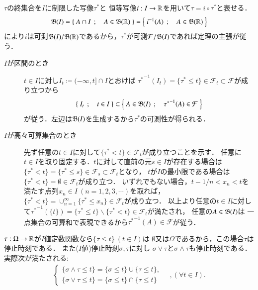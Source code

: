 	\begin{prf}
		$\tau$の終集合を$I$に制限した写像$\tau^*$と
		恒等写像$i:I \rightarrow \mathbb{R}$を用いて$\tau = i \circ \tau^*$と表せる．
		\begin{align}
			\mathfrak{B}(I)=\left\{\ A \cap I\ \, ; \quad A \in \mathfrak{B}(\mathbb{R})\ \right\} = \left\{\ i^{-1}(A)\ \, ; \quad A \in \mathfrak{B}(\mathbb{R})\ \right\}
		\end{align}
		により$i$は可測$\mathfrak{B}(I)/\mathfrak{B}(\mathbb{R})$であるから，$\tau^*$が可測$\mathcal{F}/\mathfrak{B}(I)$であれば定理の主張が従う．
		\begin{description}
			\item[$I$が区間のとき]
				$t \in I$に対し$I_t \coloneqq (-\infty,t] \cap I$とおけば
				${\tau^*}^{-1}(I_t) = \{ \tau^* \leq t \} \in \mathcal{F}_t \subset \mathcal{F}$が成り立つから
				\begin{align}
					\left\{\ I_t\ \, ; \quad t \in I\ \right\} \subset \left\{\ A \in \mathfrak{B}(I)\ \, ; \quad {\tau^*}^{-1}(A) \in \mathcal{F}\ \right\}
					\label{eq:stopping_time_mble}
				\end{align}
				が従う．左辺は$\mathfrak{B}(I)$を生成するから$\tau^*$の可測性が得られる．
				
			\item[$I$が高々可算集合のとき]
				先ず任意の$t \in I$に対して$\{ \tau^* < t \} \in \mathcal{F}_t$が成り立つことを示す．
				任意に$t \in I$を取り固定する．$t$に対して直前の元$s \in I$が存在する場合は
				$\{ \tau^* < t \} = \{ \tau^* \leq s \} \in \mathcal{F}_s \subset \mathcal{F}_t$となり，
				$t$が$I$の最小限である場合は$\{ \tau^* < t \} = \emptyset \in \mathcal{F}_t$が成り立つ．
				いずれでもない場合，$t - 1/n < x_n < t$を満たす点列$x_n \in I\ (n=1,2,3,\cdots)$を取れば，
				$\{ \tau^* < t \} = \cup_{n=1}^{\infty}\{ \tau^* \leq x_n \} \in \mathcal{F}_t$が成り立つ．
				以上より任意の$t \in I$に対して${\tau^*}^{-1}(\{t\}) = \{ \tau^* \leq t \} \backslash \{ \tau^* < t \} \in \mathcal{F}_t$が満たされ，
				任意の$A \in \mathfrak{B}(I)$は
				一点集合の可算和で表現できるから${\tau^*}^{-1}(A) \in \mathcal{F}$が従う．
				\QED
		\end{description}
	\end{prf}
	
	$\tau:\Omega \rightarrow \mathbb{R}$が$I$値定数関数なら$\{\tau \leq t\}\ (t \in I)$は
	$\emptyset$又は$\Omega$であるから，この場合$\tau$は停止時刻である．
	また($I$値)停止時刻$\sigma,\tau$に対し
	$\sigma \vee \tau$と$\sigma \wedge \tau$も停止時刻である．実際次が満たされる:
	\begin{align}
		\begin{cases}
			\{ \sigma \wedge \tau \leq t \} = \{ \sigma \leq t \} \cup \{ \tau \leq t \}, \\
			\{ \sigma \vee \tau \leq t \} = \{ \sigma \leq t \} \cap \{ \tau \leq t \}
		\end{cases}
		\quad ,(\forall t \in I).
	\end{align}
	
